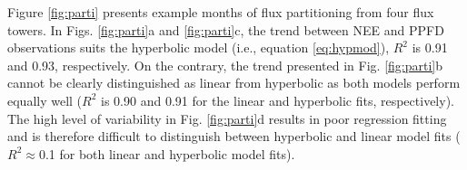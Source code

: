 Figure \ref{fig:parti} presents example months of flux partitioning from four flux towers.  
In Figs. \ref{fig:parti}a and \ref{fig:parti}c, the trend between NEE and PPFD observations suits the hyperbolic model (i.e., equation \ref{eq:hypmod}), $R^{2}$ is 0.91 and 0.93, respectively. 
On the contrary, the trend presented in Fig. \ref{fig:parti}b cannot be clearly distinguished as linear from hyperbolic as both models perform equally well ($R^{2}$ is 0.90 and 0.91 for the linear and hyperbolic fits, respectively). 
The high level of variability in Fig. \ref{fig:parti}d results in poor regression fitting and is therefore difficult to distinguish between hyperbolic and linear model fits ($R^{2}\approx$0.1 for both linear and hyperbolic model fits).

